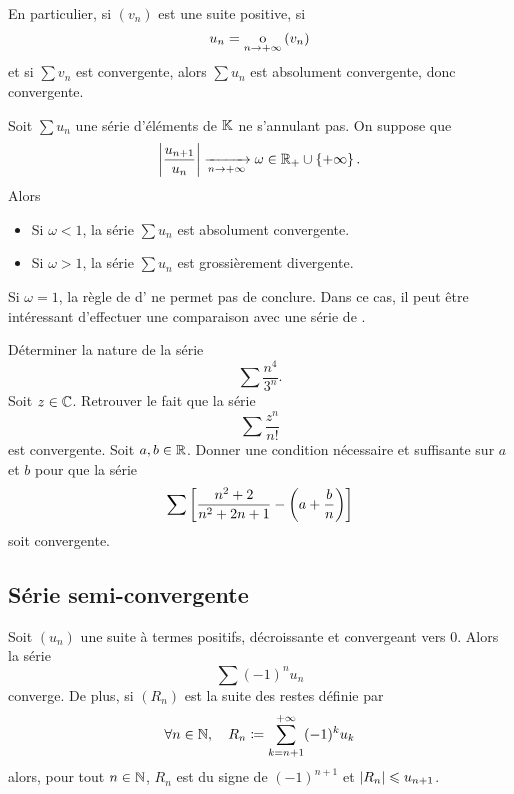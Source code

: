 \documentclass{magnolia}
\begin{document}
\begin{remarqueUnique}
\remarque En particulier, si $(v_n)$ est une suite positive, si
  \[u_n=\underset{n \rightarrow +\infty}{\text{o}}\left(v_n\right)\]
  et si $\sum v_n$ est convergente, alors $\sum u_n$ est absolument convergente, donc
  convergente.
\end{remarqueUnique}

\begin{proposition}[nom={Règle de d'\nom{Alembert}}]
Soit $\sum u_n$ une série d'éléments de $\mathbb{K}$ ne s'annulant pas. On suppose que
\[\left|\frac{u_{n+1}}{u_n}\right|\xrightarrow[n\rightarrow +\infty]{} \omega\in\mathbb{R}_+\cup\left\{+\infty\right\}.\]
Alors
\begin{itemize}
\item Si $\omega<1$, la série $\sum u_n$ est absolument convergente.
\item Si $\omega>1$, la série $\sum u_n$ est grossièrement divergente.
\end{itemize}
\end{proposition}

\begin{remarqueUnique}
\remarque Si $\omega=1$, la règle de d' ne permet pas de conclure. Dans ce cas, il peut être
  intéressant d'effectuer une comparaison avec une série de .
\end{remarqueUnique}

\begin{exos}
\exo Déterminer la nature de la série
  \[\sum \frac{n^4}{3^n}.\]
\exo Soit $z\in\mathbb{C}$. Retrouver le fait que la série
  \[\sum \frac{z^n}{n!}\]
  est convergente.
  \exo Soit $a,b\in\mathbb{R}$. Donner une condition nécessaire et suffisante sur $a$ et $b$ pour que la série
  \[\sum \left[\frac{n^2+2}{n^2+2n+1}-\left(a+\frac{b}{n}\right)\right]\]
  soit convergente.
\end{exos}

\subsection{Série semi-convergente}

\begin{theoreme}[nom={Théorème des séries alternées}]
Soit $(u_n)$ une suite à termes positifs, décroissante et convergeant vers 0.
Alors la série
\[\sum (-1)^n u_n\]
converge. De plus, si $(R_n)$ est la suite des restes définie par
\[\forall n\in\mathbb{N},\quad R_n\coloneqq\sum_{k=n+1}^{+\infty} (-1)^k u_k\]
alors, pour tout $n\in\mathbb{N}$, $R_n$ est du signe de $(-1)^{n+1}$ et $\left|R_n\right|\leqslant u_{n+1}$.
\end{theoreme}
\end{document}

